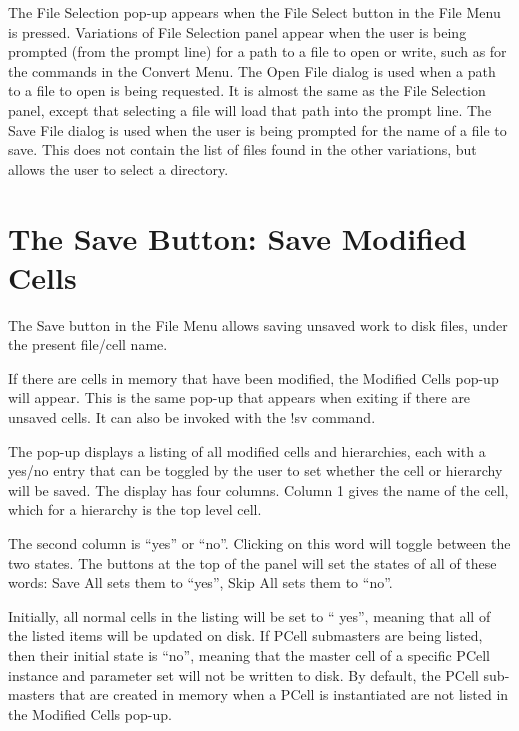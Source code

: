 The {\cb File Selection} pop-up appears when the {\cb File Select}
button in the {\Xic} {\cb File Menu} is pressed.  Variations of {\cb
File Selection} panel appear when the user is being prompted (from the
prompt line) for a path to a file to open or write, such as for the
commands in the {\cb Convert Menu}.  The {\cb Open File} dialog is
used when a path to a file to open is being requested.  It is almost
the same as the {\cb File Selection} panel, except that selecting a
file will load that path into the prompt line.  The {\cb Save File}
dialog is used when the user is being prompted for the name of a file
to save.  This does not contain the list of files found in the other
variations, but allows the user to select a directory.


\section{The {\cb Save} Button: Save Modified Cells}

The {\cb Save} button in the {\cb File Menu} allows saving unsaved
work to disk files, under the present file/cell name.
 
If there are cells in memory that have been modified, the {\cb
Modified Cells} pop-up will appear.  This is the same pop-up that
appears when exiting {\Xic} if there are unsaved cells.  It can also
be invoked with the {\cb !sv} command.

The pop-up displays a listing of all modified cells and hierarchies,
each with a yes/no entry that can be toggled by the user to set
whether the cell or hierarchy will be saved.  The display has four
columns.  Column 1 gives the name of the cell, which for a hierarchy
is the top level cell.

The second column is ``{\vt yes}'' or ``{\vt no}''.  Clicking on this
word will toggle between the two states.  The buttons at the top of
the panel will set the states of all of these words:  {\cb Save All}
sets them to ``{\vt yes}'', {\cb Skip All} sets them to ``{\vt no}''.

Initially, all normal cells in the listing will be set to ``{\vt
yes}'', meaning that all of the listed items will be updated on disk. 
If PCell submasters are being listed, then their initial state is
``{\vt no}'', meaning that the master cell of a specific PCell
instance and parameter set will not be written to disk.  By default,
the PCell sub-masters that are created in memory when a PCell is
instantiated are not listed in the {\cb Modified Cells} pop-up.

